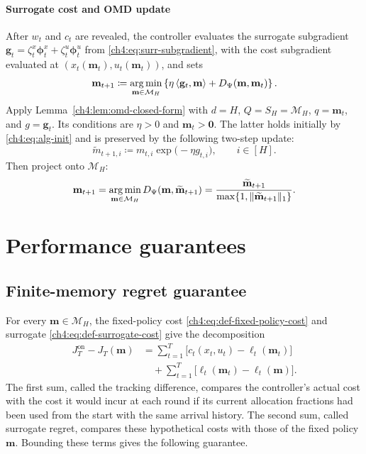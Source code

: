 \paragraph{Surrogate cost and OMD update}
After $w_t$ and $c_t$ are revealed, the controller evaluates the surrogate
subgradient $\mathbf g_t=\zeta_t^x\boldsymbol\phi_t^x+\zeta_t^u\boldsymbol\phi_t^u$
from \eqref{ch4:eq:surr-subgradient}, with the cost subgradient evaluated at
$(x_t(\mathbf m_t),u_t(\mathbf m_t))$, and sets
\begin{equation}
\label{ch4:eq:alg-omd-argmin}
\mathbf{m}_{t+1}
\coloneqq
\operatorname*{arg\,min}_{\mathbf{m}\in\mathcal{M}_H}
\left\{
\eta\left\langle \mathbf{g}_t,\mathbf{m} \right\rangle
+D_\Psi(\mathbf{m},\mathbf{m}_t)
\right\}.
\end{equation}
Apply Lemma~\ref{ch4:lem:omd-closed-form} with $d=H$, $Q=S_H=\mathcal M_H$,
$q=\mathbf m_t$, and $g=\mathbf g_t$. Its conditions are $\eta>0$ and
$\mathbf m_t>\mathbf0$. The latter holds initially by
\eqref{ch4:eq:alg-init} and is preserved by the following two-step update:
\begin{equation}
\label{ch4:eq:alg-omd-mult}
\widetilde{m}_{t+1,i}
\coloneqq
m_{t,i}\exp\!\bigl(-\eta g_{t,i}\bigr),
\qquad
i\in[H].
\end{equation}
Then project onto $\mathcal M_H$:
\begin{equation}
\label{ch4:eq:alg-omd-proj}
\mathbf{m}_{t+1}
=\operatorname*{arg\,min}_{\mathbf{m}\in\mathcal{M}_H}
D_\Psi(\mathbf{m},\widetilde{\mathbf{m}}_{t+1})
=\frac{\widetilde{\mathbf{m}}_{t+1}}
{\max\{1,\|\widetilde{\mathbf{m}}_{t+1}\|_1\}}.
\end{equation}


\section{Performance guarantees}
\label{ch4:sec:scalar-performance}

\subsection{Finite-memory regret guarantee}
\label{ch4:sec:regret-analysis}

For every $\mathbf m\in\mathcal M_H$, the fixed-policy cost
\eqref{ch4:eq:def-fixed-policy-cost} and surrogate
\eqref{ch4:eq:def-surrogate-cost} give the decomposition
\begin{equation}
\label{ch4:eq:regret-decomposition}
\begin{aligned}
 J_T^{\mathrm{on}}-J_T(\mathbf m)
 &=\sum_{t=1}^T\bigl[c_t(x_t,u_t)-\ell_t(\mathbf m_t)\bigr]\\
 &\quad+\sum_{t=1}^T\bigl[\ell_t(\mathbf m_t)-\ell_t(\mathbf m)\bigr].
\end{aligned}
\end{equation}
The first sum, called the tracking difference, compares the controller's
actual cost with the cost it would incur at each round if its current
allocation fractions had been used from the start with the same arrival
history. The second sum, called surrogate regret, compares these hypothetical
costs with those of the fixed policy $\mathbf m$.
Bounding these terms gives the following guarantee.

